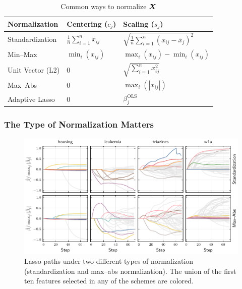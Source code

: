 \documentclass[10pt]{beamer}
\begin{document}
\begin{frame}[c]
  \begin{table}[hbt]
    \centering
    \caption{Common ways to normalize \(\bm{X}\)}
    \begin{tabular}{lll}
      \toprule
      Normalization    & Centering (\(c_{j}\))              & Scaling (\(s_j\))                                         \\
      \midrule
      Standardization  & \(\frac{1}{n}\sum_{i=1}^n x_{ij}\) & \(\sqrt{\frac{1}{n}\sum_{i=1}^n (x_{ij} - \bar{x}_j)^2}\) \\
      \addlinespace
      Min--Max         & \(\min_i(x_{ij})\)                 & \(\max_i(x_{ij}) - \min_i(x_{ij})\)                       \\
      \addlinespace
      Unit Vector (L2) & 0                                  & \(\sqrt{\sum_{i=1}^n x_{ij}^2}\)                          \\
      \addlinespace
      Max--Abs         & 0                                  & \(\max_i(|x_{ij}|)\)                                      \\
      \addlinespace
      Adaptive Lasso   & 0                                  & \(\beta_j^\text{OLS}\)                                    \\
      \bottomrule
    \end{tabular}
  \end{table}
\end{frame}

\begin{frame}[c]
  \frametitle{The Type of Normalization Matters}

  \begin{figure}[htpb]
    \centering
    \includegraphics[width=\textwidth]{figures/paper6-realdata_paths.pdf}
    \caption{%
      Lasso paths under two different types of normalization (standardization and max--abs normalization). The union of the first ten features selected in any of the schemes are colored.
    }
  \end{figure}

\end{frame}
\end{document}
